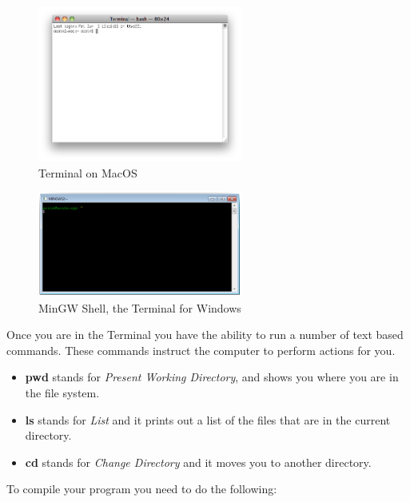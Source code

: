 \begin{figure}[p]
   \centering
   \includegraphics[width=0.6\textwidth]{./topics/program-creation/images/MacOSTerminal} 
   \caption{Terminal on MacOS}
   \label{fig:program-creation-macos-terminal}
\end{figure}

\begin{figure}[p]
   \centering
   \includegraphics[width=0.6\textwidth]{./topics/program-creation/images/MinGWShell} 
   \caption{MinGW Shell, the Terminal for Windows}
   \label{fig:program-creation-mingw-shell}
\end{figure}

Once you are in the Terminal you have the ability to run a number of text based commands. These commands instruct the computer to perform actions for you.

\begin{itemize}
  \item \textbf{pwd} stands for \emph{Present Working Directory}, and shows you where you are in the file system.
  \item \textbf{ls} stands for \emph{List} and it prints out a list of the files that are in the current directory.
  \item \textbf{cd} stands for \emph{Change Directory} and it moves you to another directory. 
\end{itemize}

To compile your program you need to do the following:

